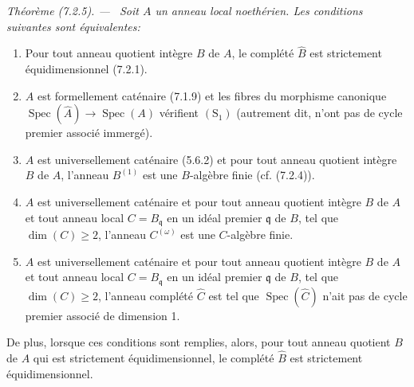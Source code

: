 \documentclass[10pt,oneside]{book}
\newenvironment{theorem}[1][]{%
  \par\medskip\noindent\itshape Théorème (#1). ---\ }{\par}
\begin{document}
\begin{theorem}[7.2.5]
\label{IV.2.s7.2.5-fr}
Soit $A$ un anneau local noethérien. Les conditions suivantes sont
équivalentes:
\begin{enumerate}
\item[a)] Pour tout anneau quotient intègre $B$ de $A$, le complété
$\widehat B$ est strictement équidimensionnel (7.2.1).
\item[b)] $A$ est formellement caténaire (7.1.9) et les fibres du morphisme
canonique $\operatorname{Spec}(\widehat A)\to\operatorname{Spec}(A)$
vérifient $(\mathrm S_1)$ (autrement dit, n'ont pas de cycle premier associé
immergé).
\item[c)] $A$ est universellement caténaire (5.6.2) et pour tout anneau
quotient intègre $B$ de $A$, l'anneau $B^{(1)}$ est une $B$-algèbre finie
(cf. (7.2.4)).
\item[d)] $A$ est universellement caténaire et pour tout anneau quotient
intègre $B$ de $A$ et tout anneau local $C=B_{\mathfrak q}$ en un idéal
premier $\mathfrak q$ de $B$, tel que $\dim(C)\geqslant2$, l'anneau
$C^{(\omega)}$ est une $C$-algèbre finie.
\item[e)] $A$ est universellement caténaire et pour tout anneau quotient
intègre $B$ de $A$ et tout anneau local $C=B_{\mathfrak q}$ en un idéal
premier $\mathfrak q$ de $B$, tel que $\dim(C)\geqslant2$, l'anneau complété
$\widehat C$ est tel que $\operatorname{Spec}(\widehat C)$ n'ait pas de
cycle premier associé de dimension 1.
\end{enumerate}
De plus, lorsque ces conditions sont remplies, alors, pour tout anneau
quotient $B$ de $A$ qui est strictement équidimensionnel, le complété
$\widehat B$ est strictement équidimensionnel.
\end{theorem}
\end{document}
